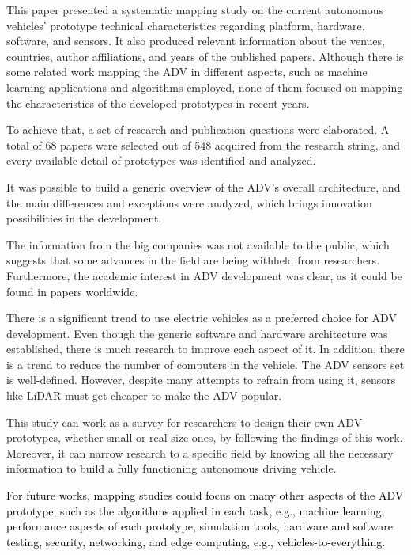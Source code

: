 \documentclass[lettersize,journal]{IEEEtran}
\begin{document}
This paper presented a systematic mapping study on the current autonomous vehicles' prototype technical characteristics regarding platform, hardware, software, and sensors. It also produced relevant information about the venues, countries, author affiliations, and years of the published papers. Although there is some related work mapping the ADV in different aspects, such as machine learning applications and algorithms employed, none of them focused on mapping the characteristics of the developed prototypes in recent years.

To achieve that, a set of research and publication questions were elaborated. A total of 68 papers were selected out of 548 acquired from the research string, and every available detail of prototypes was identified and analyzed.

It was possible to build a generic overview of the ADV's overall architecture, and the main differences and exceptions were analyzed, which brings innovation possibilities in the development.

The information from the big companies was not available to the public, which suggests that some advances in the field are being withheld from researchers. Furthermore, the academic interest in ADV development was clear, as it could be found in papers worldwide.

There is a significant trend to use electric vehicles as a preferred choice for ADV development. Even though the generic software and hardware architecture was established, there is much research to improve each aspect of it. In addition, there is a trend to reduce the number of computers in the vehicle. The ADV sensors set is well-defined. However, despite many attempts to refrain from using it, sensors like LiDAR must get cheaper to make the ADV popular. 

This study can work as a survey for researchers to design their own ADV prototypes, whether small or real-size ones, by following the findings of this work. Moreover, it can narrow research to a specific field by knowing all the necessary information to build a fully functioning autonomous driving vehicle.


\textcolor{black}{For future works, mapping studies could focus on many other aspects of the ADV prototype, such as the algorithms applied in each task, e.g., machine learning, performance aspects of each prototype, simulation tools, hardware and software testing, security, networking, and edge computing, e.g., vehicles-to-everything.}
\end{document}
